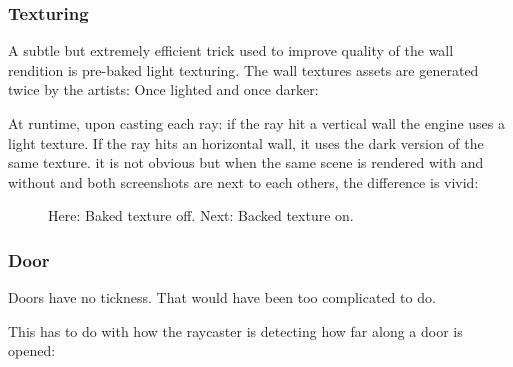 \subsubsection{Texturing}
A subtle but extremely efficient trick used to improve quality of the wall rendition is pre-baked light texturing. The wall textures assets are generated twice by the artists: Once lighted and once darker:\\
  \begin{figure}[H]
\centering
 \end{figure}
\par
  \begin{figure}[H]
\centering
 \end{figure}
\par
At runtime, upon casting each ray: if the ray hit a vertical wall the engine uses a light texture. If the ray hits an horizontal wall, it uses the dark version of the same texture. it is not obvious but when the same scene is rendered with and without and both screenshots are next to each others, the difference is vivid:\\
\begin{minipage}{\textwidth}
\begin{figure}[H]
\centering
 \caption{Here: Baked texture off. Next: Backed texture on.}
 \end{figure}

\begin{figure}[H]
\centering
 
 \end{figure}
 \end{minipage}




 





\subsubsection{Door}
Doors have no tickness. That would have been too complicated to do.\\
\par
\begin{figure}[H]
 \centering
\end{figure}

\par
This has to do with how the raycaster is detecting how far along a door is opened:\\

